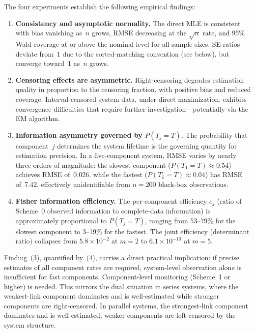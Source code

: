 The four experiments establish the following empirical findings:
\begin{enumerate}
  \item \textbf{Consistency and asymptotic normality.}
    The direct MLE is consistent with bias vanishing as~$n$ grows, RMSE
    decreasing at the $\sqrt{n}$ rate, and 95\% Wald coverage at or
    above the nominal level for all sample sizes.  SE ratios
    deviate from~1 due to the sorted-matching convention (see below),
    but converge toward~1 as~$n$ grows.

  \item \textbf{Censoring effects are asymmetric.}
    Right-censoring degrades estimation quality in proportion to the
    censoring fraction, with positive bias and reduced coverage.
    Interval-censored system data, under direct maximization, exhibits
    convergence difficulties that require further investigation---potentially
    via the EM algorithm.

  \item \textbf{Information asymmetry governed by $P(T_j = T)$.}
    The probability that component~$j$ determines the system lifetime is
    the governing quantity for estimation precision.  In a five-component
    system, RMSE varies by nearly three orders of magnitude: the slowest
    component ($P(T_1 = T) \approx 0.54$) achieves RMSE of~0.026, while
    the fastest ($P(T_5 = T) \approx 0.04$) has RMSE of~7.42,
    effectively unidentifiable from $n = 200$ black-box observations.

  \item \textbf{Fisher information efficiency.}
    The per-component efficiency $e_j$ (ratio of Scheme~0 observed
    information to complete-data information) is approximately
    proportional to $P(T_j = T)$, ranging from 53--79\% for the
    slowest component to 3--19\% for the fastest.  The joint
    efficiency (determinant ratio) collapses from $5.8 \times 10^{-2}$
    at $m = 2$ to $6.1 \times 10^{-10}$ at $m = 5$.
\end{enumerate}

Finding~(3), quantified by~(4), carries a direct practical implication:
if precise estimates of all component rates are required, system-level
observation alone is insufficient for fast components.  Component-level
monitoring (Scheme~1 or higher) is needed.  This mirrors the dual
situation in series systems, where the weakest-link component dominates
and is well-estimated while stronger components are right-censored.  In
parallel systems, the strongest-link component dominates and is
well-estimated; weaker components are left-censored by the system
structure.
